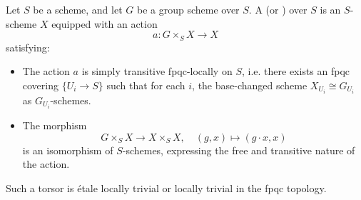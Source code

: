 \begin{definition} \label{definition:principal_homogeneous_space_for_a_group_scheme_over_a_base_scheme}
    Let $S$ be a scheme, and let $G$ be a group scheme over $S$.  
    A  (or ) over $S$ is an $S$-scheme $X$ equipped with an action
    $$a: G \times_S X \to X$$
    satisfying:
    \begin{itemize}
        \item The action $a$ is simply transitive fpqc-locally on $S$, i.e. there exists an fpqc covering $\{U_i \to S\}$ such that for each $i$, the base-changed scheme $X_{U_i} \cong G_{U_i}$ as $G_{U_i}$-schemes.
        \item The morphism 
        $$G \times_S X \to X \times_S X, \quad (g,x) \mapsto (g \cdot x, x)$$
        is an isomorphism of $S$-schemes, expressing the free and transitive nature of the action.
    \end{itemize}
    Such a torsor is \'etale locally trivial or locally trivial in the fpqc topology.  
\end{definition}

